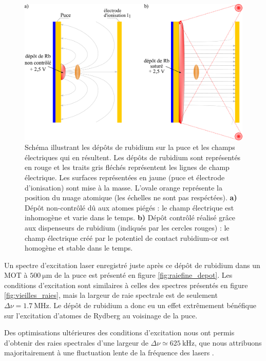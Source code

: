 %
\begin{figure}[h]
\centering
\includegraphics[width=\linewidth]{figures/setup/rydberg/depotRb}
\caption[Dépôt contrôlé de rubidium sur la puce]{
Schéma illustrant les dépôts de rubidium sur la puce et les champs électriques qui en résultent.
Les dépôts de rubidium sont représentés en rouge et les traits gris fléchés représentent les lignes de champ électrique.
Les surfaces représentées en jaune (puce et électrode d'ionisation) sont mise à la masse.
L'ovale orange représente la position du nuage atomique (les échelles ne sont pas respéctées).
\textbf{a)} Dépôt non-contrôlé dû aux atomes piégés : le champ électrique est inhomogène et varie dans le temps.
\textbf{b)} Dépôt contrôlé réalisé grâce aux dispenseurs de rubidium (indiqués par les cercles rouges) : le champ électrique créé par le potentiel de contact rubidium-or est homogène et stable dans le temps.
}
\label{fig:depotRb}
\end{figure}
%

\clearpage
Un spectre d'excitation laser enregistré juste après ce dépôt de rubidium dans un MOT à $\SI{500}{\um}$ de la puce est présenté en figure \eqref{fig:raiefine_depot}.
Les conditions d'excitation sont similaires à celles des spectres présentés en figure \eqref{fig:vieilles_raies}, mais la largeur de raie spectrale est de seulement $\Delta\nu=\SI{1.7}{\MHz}$.
Le dépôt de rubidium a donc eu un effet extrêmement bénéfique sur l'excitation d'atomes de Rydberg au voisinage de la puce.

Des optimisations ultérieures des conditions d'excitation nous ont permis d'obtenir des raies spectrales d'une largeur de $\Delta\nu \simeq \SI{625}{\kHz}$, que nous attribuons majoritairement à une fluctuation lente de la fréquence des lasers \cite{PHD_CELISTRINO}.

